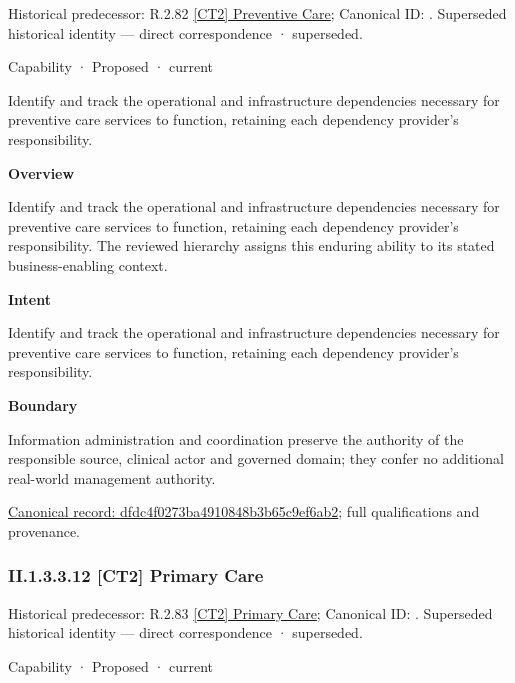 {\small Historical predecessor: R.2.82 \hyperref[element:97f0d1acc37b4ca994c6c1ca006f2daa]{[CT2] Preventive Care}; Canonical ID: \texttt{}. Superseded historical identity — direct correspondence · superseded.}\par
\label{element:dfdc4f0273ba4910848b3b65c9ef6ab2}
{\small Capability · Proposed · current}\par

Identify and track the operational and infrastructure dependencies necessary for preventive care services to function, retaining each dependency provider's responsibility.



\textbf{Overview}



Identify and track the operational and infrastructure dependencies necessary for preventive care services to function, retaining each dependency provider's responsibility. The reviewed hierarchy assigns this enduring ability to its stated business-enabling context.



\textbf{Intent}



Identify and track the operational and infrastructure dependencies necessary for preventive care services to function, retaining each dependency provider's responsibility.



\textbf{Boundary}



Information administration and coordination preserve the authority of the responsible source, clinical actor and governed domain; they confer no additional real-world management authority.


{\footnotesize \href{../../../../continuum/strategy/capability/dfdc4f0273ba4910848b3b65c9ef6ab2.md}{Canonical record: dfdc4f0273ba4910848b3b65c9ef6ab2}; full qualifications and provenance.}\par
\subsubsection*{II.1.3.3.12 [CT2] Primary Care}
\label{navigation:II.1.3.3.12}

{\small Historical predecessor: R.2.83 \hyperref[element:fe9d58b5cfe14e8cb7a83a1ac6686d65]{[CT2] Primary Care}; Canonical ID: \texttt{}. Superseded historical identity — direct correspondence · superseded.}\par
\label{element:d118673d77d74c8cb8cec24f03adddd8}
{\small Capability · Proposed · current}\par

